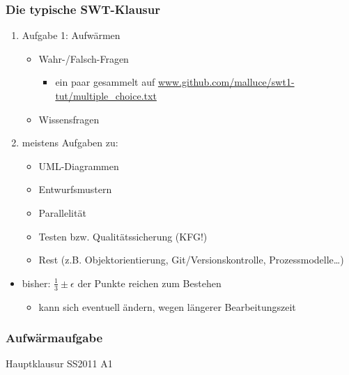\documentclass[18pt]{beamer}
\begin{document}
	\begin{frame}
		\frametitle{Die typische SWT-Klausur}
		\begin{enumerate}
			\item Aufgabe 1: Aufwärmen
			\begin{itemize}
				\item Wahr-/Falsch-Fragen 
				\begin{itemize}
					\item ein paar gesammelt auf \url{www.github.com/malluce/swt1-tut/multiple_choice.txt}
				\end{itemize} 
				\item Wissensfragen 
			\end{itemize} 
			\pause
			\item meistens Aufgaben zu:
			\begin{itemize}
				\item UML-Diagrammen \pause
				\item Entwurfsmustern \pause
				\item Parallelität \pause
				\item Testen bzw. Qualitätssicherung (KFG!) \pause
				\item Rest (z.B. Objektorientierung, Git/Versionskontrolle, Prozessmodelle\dots)
			\end{itemize}
		\end{enumerate}
		\pause 
		\begin{itemize}
			\item bisher: $\frac{1}{3} \pm \epsilon$ der Punkte reichen zum Bestehen
			\begin{itemize}
				\item kann sich eventuell ändern, wegen längerer Bearbeitungszeit
			\end{itemize}
		\end{itemize}
	\end{frame}

	\begin{frame}
		\frametitle{Aufwärmaufgabe}
		\begin{huge}
			\centering Hauptklausur SS2011 A1
		\end{huge}
	\end{frame}
\end{document}
